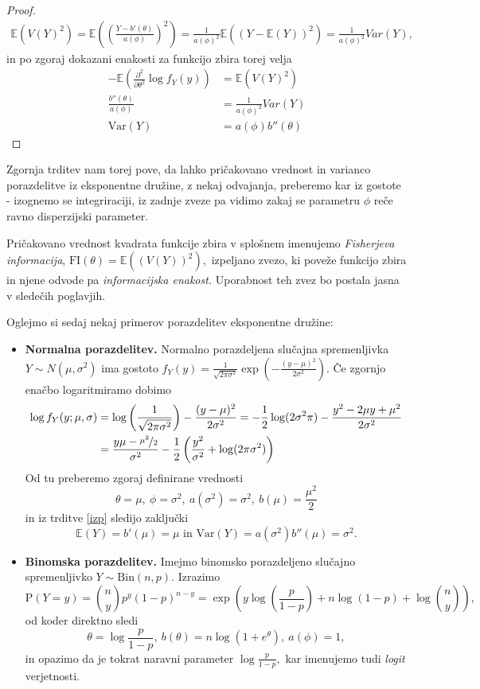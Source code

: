 \documentclass[12pt,a4paper]{amsart}
\theoremstyle{definition} %
\theoremstyle{plain} %
\begin{document}
\begin{proof}
\begin{gather*}
    \mathbb{E}\left(V(Y)^2\right) = \mathbb{E}\left(\left(\frac{Y-b'(\theta)}{a(\phi) }\right)^2\right) = \frac{1}{a(\phi)^2}\mathbb{E}((Y - \mathbb{E}(Y))^2) = \frac{1}{a(\phi)^2}Var(Y),
\end{gather*}
in po zgoraj dokazani enakosti za funkcijo zbira torej velja
\begin{align*}
    -\mathbb{E}\left(\frac{\partial^2}{\partial\theta^2}\log f_{Y}(y)\right) &= \mathbb{E}\left(V(Y)^2\right) \\
    \frac{b''(\theta)}{a(\phi)} &= \frac{1}{a(\phi)^2}Var(Y) \\
    \mathrm{Var}(Y) &= a(\phi)b''(\theta)
\end{align*}
\end{proof}
Zgornja trditev nam torej pove, da lahko pričakovano vrednost in varianco porazdelitve iz eksponentne družine, z nekaj odvajanja, preberemo kar iz gostote - izognemo se integriraciji, iz zadnje
zveze pa vidimo zakaj se parametru $\phi$ reče ravno disperzijski parameter.

Pričakovano vrednost kvadrata funkcije zbira v splošnem imenujemo \textit{Fisherjeva informacija}, $\mathrm{FI}(\theta) = \mathbb{E}((V(Y))^2),$ izpeljano zvezo, ki poveže funkcijo zbira in njene odvode pa \textit{informacijska enakost.}
Uporabnost teh zvez bo postala jasna v sledečih poglavjih.

Oglejmo si sedaj nekaj primerov porazdelitev eksponentne družine:
\begin{itemize}
    \item \textbf{Normalna porazdelitev.} Normalno porazdeljena slučajna spremenljivka $Y \sim N(\mu, \sigma^2)$
    ima gostoto $f_{Y}(y) = \frac{1}{\sqrt{2\pi\sigma^2}}\exp{\left(-\frac{(y-\mu)^2}{2\sigma^2}\right)}.$
    Če zgornjo enačbo logaritmiramo dobimo
    \begin{align*}
        \log f_{Y}(y;\mu, \sigma) &= \log\left(\frac{1}{\sqrt{2\pi\sigma^2}}\right) -\frac{(y-\mu)^2}{2\sigma^2} = -\frac{1}{2}\log(2\sigma^2\pi) - \frac{y^2 - 2\mu y + \mu^2}{2 \sigma^2}    \\ \nonumber
                            &= \frac{y\mu-\nicefrac{\mu^2}{2}}{\sigma^2} - \frac{1}{2}\left(\frac{y^2}{\sigma^2} + \log(2\pi\sigma^2)\right) 
    \end{align*}
    Od tu preberemo zgoraj definirane vrednosti
    \[
        \theta = \mu,~\phi = \sigma^2,~a(\sigma^2)=\sigma^2,~b(\mu) = \frac{\mu^2}{2}
    \]
    in iz trditve \ref{izp} sledijo zaključki
    \[
        \mathbb{E}(Y) = b'(\mu) = \mu \text{ in } \mathrm{Var}(Y) = a(\sigma^2)b''(\mu) = \sigma^2.
    \]

    \item \textbf{Binomska porazdelitev.} Imejmo binomsko porazdeljeno slučajno spremenljivko $Y \sim \mathrm{Bin}(n,p).$ Izrazimo 
    \[
        \mathrm{P}(Y = y) = \binom{n}{y}p^y(1-p)^{n-y} = \exp\left(y\log(\frac{p}{1-p}) + n\log(1-p) + \log{\binom{n}{y}}\right),
    \]
    od koder direktno sledi
    \[
        \theta = \log\frac{p}{1-p},~b(\theta) = n\log(1 + e^{\theta}),~a(\phi) = 1,
    \]
    in opazimo da je tokrat naravni parameter $\log\frac{p}{1-p},$ kar imenujemo tudi \textit{logit} verjetnosti.
\end{itemize}
\end{document}
